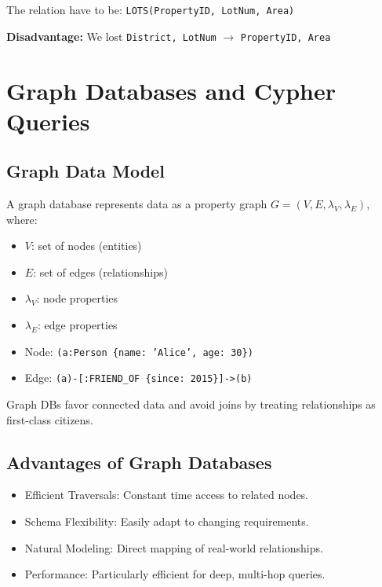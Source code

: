 \documentclass{article}
\begin{document}
The relation have to be: \texttt{LOTS(PropertyID, LotNum, Area)}

\textbf{Disadvantage: }We lost \texttt{District, LotNum} $\to$ \texttt{PropertyID, Area}

\newpage
\section{Graph Databases and Cypher Queries}

\subsection*{Graph Data Model}
A graph database represents data as a property graph \( G = (V, E, \lambda_V, \lambda_E) \), where:
\begin{itemize}
  \item \( V \): set of nodes (entities)
  \item \( E \): set of edges (relationships)
  \item \( \lambda_V \): node properties
  \item \( \lambda_E \): edge properties
\end{itemize}

\begin{itemize}
  \item Node: \texttt{(a:Person \{name: 'Alice', age: 30\})}
  \item Edge: \texttt{(a)-[:FRIEND\_OF \{since: 2015\}]->(b)}
\end{itemize}

Graph DBs favor connected data and avoid joins by treating relationships as first-class citizens.

\subsection*{Advantages of Graph Databases}
\begin{itemize}
    \item Efficient Traversals: Constant time access to related nodes.
    \item Schema Flexibility: Easily adapt to changing requirements.
    \item Natural Modeling: Direct mapping of real-world relationships.
    \item Performance: Particularly efficient for deep, multi-hop queries.
\end{itemize}
\end{document}
